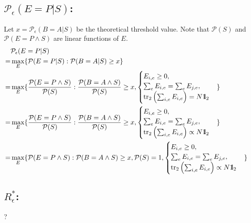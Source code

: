 \documentclass[12pt,a4paper,reqno, aps, superscriptaddress]{amsart}
\newcommand{\Id}{{\rm 1\hspace{-0.9mm}l}}
\newcommand{\PP}{\ensuremath{\mathcal{P}}}
\begin{document}
\subsection{$\PP_\epsilon(E=P|S)$:} Let $x=\PP_\epsilon(B=A|S)$ be the 
theoretical threshold value. Note that $\PP(S)$ and $\PP(E=P \wedge S)$ are 
linear functions of $E$.
\begin{equation}
\begin{split}
&\PP_\epsilon(E=P|S)\\ =& \max_{E} \{\PP(E=P|S): \PP(B=A|S) \ge 
x\}\\
=& \max_{E} \{\frac{\PP(E=P \wedge S)}{\PP(S)}: \frac{\PP(B=A \wedge 
S)}{\PP(S)} \ge x, 
\begin{cases} E_{i,e} \ge 0,\\ \sum_{e} E_{i,e} = \sum_{e} E_{j,e},
\\    \tr_{2} \left( \sum_{i,e} E_{i,e} \right) = N \Id_2 \end{cases} \}\\
=& \max_{E} \{\frac{\PP(E=P \wedge S)}{\PP(S)}: \frac{\PP(B=A \wedge 
S)}{\PP(S)} \ge x, 
\begin{cases} E_{i,e} \ge 0,\\ \sum_{e} E_{i,e} = \sum_{e} E_{j,e},
\\    \tr_{2} \left( \sum_{i,e} E_{i,e} \right) \propto N \Id_2 \end{cases} \}\\
=& \max_{E} \{\PP(E=P \wedge S): \PP(B=A \wedge 
S) \ge x, \PP(S)=1,
\begin{cases} E_{i,e} \ge 0,\\ \sum_{e} E_{i,e} = \sum_{e} E_{j,e},
\\    \tr_{2} \left( \sum_{i,e} E_{i,e} \right) \propto N \Id_2 \end{cases} \}\\
\end{split}
\end{equation}

\subsection{$R^*_\epsilon$:} ?



 

\end{document}
